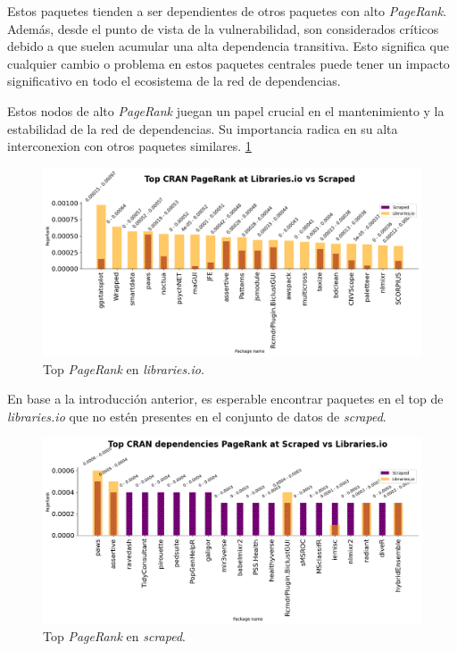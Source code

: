 Estos paquetes tienden a ser dependientes de otros paquetes con alto \textit{PageRank}. Además, desde el
punto de vista de la vulnerabilidad, son considerados críticos debido a que suelen acumular una alta
dependencia transitiva. Esto significa que cualquier cambio o problema en estos paquetes centrales puede
tener un impacto significativo en todo el ecosistema de la red de dependencias.

Estos nodos de alto \textit{PageRank} juegan un papel crucial en el mantenimiento y la estabilidad de la
red de dependencias. Su importancia radica en su alta interconexion con otros paquetes similares. \ref{fig:cran_pr_libio_top}

\begin{figure}[h!]
    \begin{center}
        \includegraphics[width=1\textwidth]{img/cran/pr_top.png}
        \caption{Top \textit{PageRank} en \textit{libraries.io}.}
        \label{fig:cran_pr_libio_top}
    \end{center}
\end{figure}



En base a la introducción anterior, es esperable encontrar paquetes en el top de \textit{libraries.io}
que no estén presentes en el conjunto de datos de \textit{scraped}.

\begin{figure}[h!]
    \begin{center}
        \includegraphics[width=1\textwidth]{img/cran/pr_top2.png}
        \caption{Top \textit{PageRank} en \textit{scraped}.}
        \label{fig:cran_pr_scraped_top}
    \end{center}
\end{figure}

